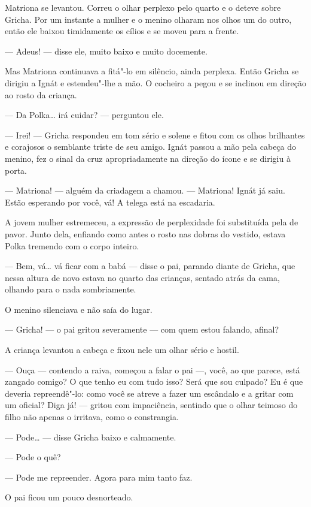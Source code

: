 Matriona se levantou. Correu o olhar perplexo pelo quarto e o deteve
sobre Gricha. Por um instante a mulher e o menino olharam nos olhos um
do outro, então ele baixou timidamente os cílios e se moveu para a
frente.

--- Adeus! --- disse ele, muito baixo e muito docemente.

Mas Matriona continuava a fitá"-lo em silêncio, ainda perplexa. Então
Gricha se dirigiu a Ignát e estendeu"-lhe a mão. O cocheiro a pegou e se
inclinou em direção ao rosto da criança.

--- Da Polka\ldots{} irá cuidar? --- perguntou ele.

--- Irei! --- Gricha respondeu em tom sério e solene e fitou com os
olhos brilhantes e corajosos o semblante triste de seu amigo. Ignát
passou a mão pela cabeça do menino, fez o sinal da cruz apropriadamente
na direção do ícone e se dirigiu à porta.

--- Matriona! --- alguém da criadagem a chamou. --- Matriona! Ignát já
saiu. Estão esperando por você, vá! A telega está na escadaria.

A jovem mulher estremeceu, a expressão de perplexidade foi substituída
pela de pavor. Junto dela, enfiando como antes o rosto nas dobras do
vestido, estava Polka tremendo com o corpo inteiro.

--- Bem, vá\ldots{} vá ficar com a babá --- disse o pai, parando diante de
Gricha, que nessa altura de novo estava no quarto das crianças, sentado
atrás da cama, olhando para o nada sombriamente.

O menino silenciava e não saía do lugar.

--- Gricha! --- o pai gritou severamente --- com quem estou falando,
afinal?

A criança levantou a cabeça e fixou nele um olhar sério e hostil.

--- Ouça --- contendo a raiva, começou a falar o pai ---, você, ao que
parece, está zangado comigo? O que tenho eu com tudo isso? Será que sou
culpado? Eu é que deveria repreendê"-lo: como você se atreve a fazer um
escândalo e a gritar com um oficial? Diga já! --- gritou com
impaciência, sentindo que o olhar teimoso do filho não apenas o
irritava, como­ o constrangia.

--- Pode\ldots{} --- disse Gricha baixo e calmamente.

--- Pode o quê?

--- Pode me repreender. Agora para mim tanto faz.

O pai ficou um pouco desnorteado.

